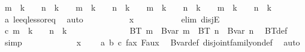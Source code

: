 \begin{isabellebody}
\ {\isachardoublequoteopen}m\ {\isacharless}{\kern0pt}\ k\ {\isacharplus}{\kern0pt}\ {}\ {\isasymand}\ n\ {\isacharless}{\kern0pt}\ k\ {\isacharplus}{\kern0pt}\ {}\ {\isasymor}\ m\ {\isacharequal}{\kern0pt}\ k\ {\isacharplus}{\kern0pt}\ {}\ {\isasymand}\ n\ {\isacharequal}{\kern0pt}\ k\ {\isacharplus}{\kern0pt}\ {}\ {\isasymor}\ m\ {\isacharless}{\kern0pt}\ k\ {\isacharplus}{\kern0pt}\ {}\ {\isasymand}\ n\ {\isacharequal}{\kern0pt}\ k\ {\isacharplus}{\kern0pt}\ {}\ {\isasymor}\ m\ {\isacharequal}{\kern0pt}\ k\ {\isacharplus}{\kern0pt}\ {}\ {\isasymand}\ n\ {\isacharless}{\kern0pt}\ k\ {\isacharplus}{\kern0pt}\ {}{\isachardoublequoteclose}\ \isamarkupfalse%
\ a\ le{\isacharunderscore}{\kern0pt}eq{\isacharunderscore}{\kern0pt}less{\isacharunderscore}{\kern0pt}or{\isacharunderscore}{\kern0pt}eq\ \isamarkupfalse%
\ auto\isanewline
\ \ \ \ \ \ \ \isamarkupfalse%
\ \isamarkupfalse%
\ {\isachardoublequoteopen}x\ {\isasymin}\ {\isacharbraceleft}{\kern0pt}{\isacharbraceright}{\kern0pt}{\isachardoublequoteclose}\isanewline
\ \ \ \ \ \ \ \isamarkupfalse%
\ {\isacharparenleft}{\kern0pt}elim\ disjE{\isacharparenright}{\kern0pt}\isanewline
\ \ \ \ \ \ \ \ \ \isamarkupfalse%
\ c{\isacharcolon}{\kern0pt}\ {\isachardoublequoteopen}m\ {\isacharless}{\kern0pt}\ k\ {\isacharplus}{\kern0pt}\ {}\ {\isasymand}\ n\ {\isacharless}{\kern0pt}\ k\ {\isacharplus}{\kern0pt}\ {}{\isachardoublequoteclose}\isanewline
\ \ \ \ \ \ \ \ \ \isamarkupfalse%
\ \isamarkupfalse%
\ {\isachardoublequoteopen}BT\ m\ {\isacharequal}{\kern0pt}\ Bvar\ m\ {\isasymand}\ BT\ n\ {\isacharequal}{\kern0pt}\ Bvar\ n{\isachardoublequoteclose}\ \isamarkupfalse%
\ BT{\isacharunderscore}{\kern0pt}def\ \isamarkupfalse%
\ simp\isanewline
\ \ \ \ \ \ \ \ \ \isamarkupfalse%
\ \isamarkupfalse%
\ {\isachardoublequoteopen}x\ {\isasymin}\ {\isacharbraceleft}{\kern0pt}{\isacharbraceright}{\kern0pt}{\isachardoublequoteclose}\ \isamarkupfalse%
\ a\ b\ c\ fax{}\ F{}{\isacharunderscore}{\kern0pt}aux\ \isamarkupfalse%
\ Bvar{\isacharunderscore}{\kern0pt}def\ disjoint{\isacharunderscore}{\kern0pt}family{\isacharunderscore}{\kern0pt}on{\isacharunderscore}{\kern0pt}def\ \isamarkupfalse%
\ auto\isanewline
\ \ \ \ \ \ \ \isamarkupfalse%

\end{isabellebody}
